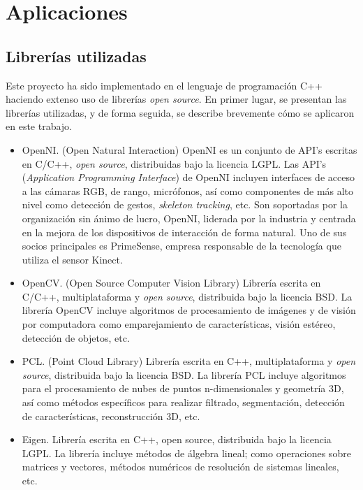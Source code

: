 
\chapter{Aplicaciones}

\section{Librerías utilizadas}

Este proyecto ha sido implementado en el lenguaje de programación C++\cite{cplusplus} haciendo extenso uso de librerías \textit{open source}. En primer lugar, se presentan las librerías utilizadas, y de forma seguida, se describe brevemente cómo se aplicaron en este trabajo.

\begin{itemize}

\item OpenNI. (Open Natural Interaction) OpenNI es un conjunto de API’s escritas en C/C++, \textit{open source}, distribuidas bajo la licencia LGPL. Las API's (\textit{Application Programming Interface}) de OpenNI incluyen interfaces de acceso a las cámaras RGB, de rango, micrófonos, así como componentes de más alto nivel como detección de gestos, \textit{skeleton tracking}, etc.
Son soportadas por la organización sin ánimo de lucro, OpenNI, liderada por la industria y centrada en la mejora de los dispositivos de interacción de forma natural. Uno de sus socios principales es PrimeSense, empresa responsable de la tecnología que utiliza el sensor Kinect. 

\item OpenCV. (Open Source Computer Vision Library) Librería escrita en C/C++, multiplataforma y \textit{open source}, distribuida bajo la licencia BSD. La librería OpenCV incluye algoritmos de procesamiento de imágenes y de visión por computadora como emparejamiento de características, visión estéreo, detección de objetos, etc.

\item PCL. (Point Cloud Library) Librería escrita en C++, multiplataforma y \textit{open source}, distribuida bajo la licencia BSD. La librería PCL incluye algoritmos para el procesamiento de nubes de puntos n-dimensionales y geometría 3D, así como métodos específicos para realizar filtrado, segmentación, detección de características, reconstrucción 3D, etc.

\item Eigen. Librería escrita en C++, open source, distribuida bajo la licencia LGPL. La librería incluye métodos de álgebra lineal; como operaciones sobre matrices y vectores, métodos numéricos de resolución de sistemas lineales, etc.


\end{itemize}
